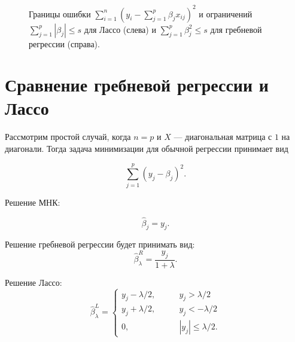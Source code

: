 \documentclass[specialist,
               subf,href,colorlinks=true, 12pt,a4paper]{article} %
\numberwithin{equation}{section}
\begin{document}
\begin{enumerate}
\begin{figure}[h]\label{lasso_pic}
\caption{Границы ошибки $\sum_{i=1}^n(y_i - \sum_{j=1}^p \beta_j x_{ij})^2$ и ограничений  $\sum_{j = 1}^p |\beta_j| \leq s$ для Лассо (слева) и $\sum_{j = 1}^p \beta_j^2 \leq s$ для гребневой регрессии (справа).}
\label{lasso_pic}
\end{figure}
\end{enumerate}

\newpage

\section{Сравнение гребневой регрессии и Лассо}

Рассмотрим простой случай, когда $n = p$ и $X$ --- диагональная матрица с $1$ на диагонали. Тогда задача минимизации для обычной регрессии принимает вид

\begin{equation*}
\sum_{j =1}^p (y_j - \beta_j)^2.
\end{equation*}

Решение МНК:

\begin{equation*}
\hat{\beta}_j = y_j.
\end{equation*}


Решение гребневой регрессии будет принимать вид:
\[\hat{\beta}_{\lambda}^R = \frac{y_j}{1 + \lambda}.\]

Решение Лассо:
\begin{equation*}
\hat{\beta}_{\lambda}^L = 
 \begin{cases}
   y_j - \lambda/2, & \qquad y_j > \lambda/2\\
   y_j + \lambda/2, & \qquad y_j < -\lambda/2 \\
   0, & \qquad |y_j| \leq \lambda/2.
 \end{cases}
\end{equation*}
\end{document}
